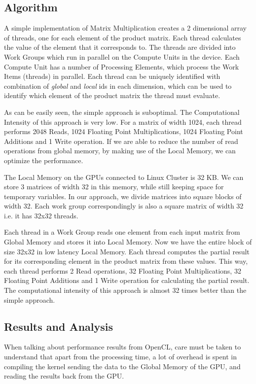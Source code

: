 \documentclass[]{scrartcl}
\begin{document}
\subsection{Algorithm}
A simple implementation of Matrix Multiplication creates a 2 dimensional array of threads, one for
each element of the product matrix. Each thread calculates the value of the element that it corresponds to. The threads are divided into Work Groups which run in parallel on the Compute Units
in the device. Each Compute Unit has a number of Processing Elements, which process the Work Items
(threads) in parallel. Each thread can be uniquely identified with combination of \textit{global} and \textit{local} ids in each dimension, which can be used to identify which element of the product
matrix the thread must evaluate.

As can be easily seen, the simple approach is suboptimal. The Computational Intensity of this approach is very low. For a matrix of width 1024, each thread performs 2048 Reads, 1024 Floating Point Multiplications, 1024 Floating Point Additions and 1 Write operation. If we are able to reduce the number of read operations from global memory, by making use of the Local Memory, we can optimize the performance. 

The Local Memory on the GPUs connected to Linux Cluster is 32 KB. We can store 3 matrices of width 32 in this memory, while still keeping space for temporary variables. In our approach, we divide
matrices into square blocks of width 32. Each work group correspondingly is also a square matrix of width 32 i.e. it has 32x32 threads. 

Each thread in a Work Group reads one element from each input matrix from Global Memory
and stores it into Local Memory. Now we have the entire block of size 32x32 in low latency Local Memory. Each thread computes the partial result for its corresponding element in the product matrix
from these values. This way, each thread performs 2 Read operations, 32 Floating Point
Multiplications, 32 Floating Point Additions and 1 Write operation for calculating the partial result. The computational intensity of this approach is almost 32 times better than the simple approach.

\subsection{Results and Analysis}
When talking about performance results from OpenCL, care must be taken to understand that apart from the processing time,
a lot of overhead is spent in compiling the kernel sending the data to the Global Memory of the GPU, and reading the results
back from the GPU. 
\end{document}

